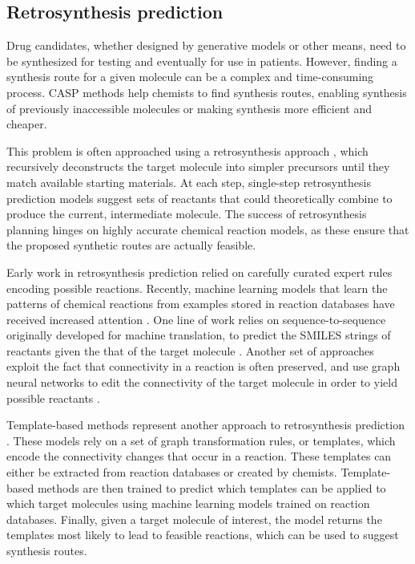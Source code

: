 \subsection{Retrosynthesis prediction}
Drug candidates, whether designed by generative models or other means, need to be
synthesized for testing and eventually for use in patients. However, finding a synthesis route for a
given molecule can be a complex and time-consuming process. \Ac{CASP} methods help
chemists to find synthesis routes, enabling synthesis of previously inaccessible molecules or making
synthesis more efficient and cheaper.

This problem is often approached using a retrosynthesis approach
\citep{coreyComputerAssistedDesignComplex1969,coreyLogicChemicalSynthesis1991a}, which
recursively deconstructs the target molecule into simpler precursors until they match available
starting materials. At each step, single-step retrosynthesis prediction models suggest sets of
reactants that could theoretically combine to produce the current, intermediate molecule.
The success of retrosynthesis planning hinges on highly accurate chemical reaction models, as these
ensure that the proposed synthetic routes are actually feasible.

Early work in retrosynthesis prediction relied on carefully curated expert rules  encoding
possible reactions. Recently, machine learning models that learn the patterns of chemical reactions
from examples stored in reaction databases have received increased attention
\citep{coleyMachineLearningComputerAided2018}. One line of work relies on sequence-to-sequence
originally developed for machine translation, to predict the SMILES strings of reactants given the
that of the target molecule
\citep{schwallerMolecularTransformerModel2019,namLinkingNeuralMachine2016,schwallerFoundTranslationPredicting2018,karpovTransformerModelRetrosynthesis2019,tetkoStateoftheartAugmentedNLP2020}.
Another set of approaches exploit the fact that connectivity in a reaction is often preserved, and
use graph neural networks to edit the connectivity of the target molecule in order to yield possible
reactants \citep{sachaMoleculeEditGraph2020,shiGraphGraphsFramework2020,somnathLearningGraphModels2020,yanRetroXpertDecomposeRetrosynthesis2020}.

Template-based methods represent another approach to retrosynthesis prediction
\citep{seglerNeuralSymbolicMachineLearning2017,seglerPlanningChemicalSyntheses2018,daiRetrosynthesisPredictionConditional2020,sunEnergybasedViewRetrosynthesis2020}.
These models rely on a set of graph transformation rules, or templates, which encode the
connectivity changes that occur in a reaction. These templates can either be extracted from
reaction databases or created by chemists. Template-based methods are then trained to predict
which templates can be applied to which target molecules using machine learning models trained on
reaction databases. Finally, given a target molecule of interest, the model returns the
templates most likely to lead to feasible reactions, which can be used to suggest synthesis routes.

